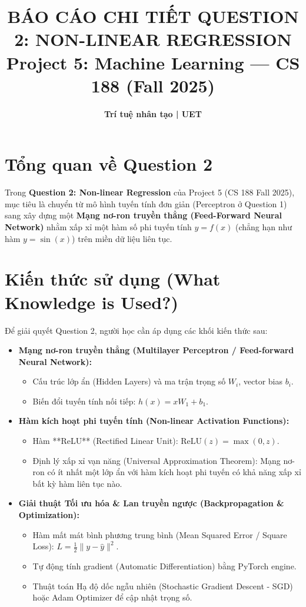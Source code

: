 \documentclass[11pt, a4paper]{article}
\title{\textbf{\Large BÁO CÁO CHI TIẾT QUESTION 2: NON-LINEAR REGRESSION}\\[0.3em]
\large Project 5: Machine Learning --- CS 188 (Fall 2025)}
\author{\textbf{Trí tuệ nhân tạo | UET}}
\begin{document}
\maketitle

\section{Tổng quan về Question 2}
Trong \textbf{Question 2: Non-linear Regression} của Project 5 (CS 188 Fall 2025), mục tiêu là chuyển từ mô hình tuyến tính đơn giản (Perceptron ở Question 1) sang xây dựng một \textbf{Mạng nơ-ron truyền thẳng (Feed-Forward Neural Network)} nhằm xấp xỉ một hàm số phi tuyến tính $y = f(x)$ (chẳng hạn như hàm $y = \sin(x)$) trên miền dữ liệu liên tục.

\section{Kiến thức sử dụng (What Knowledge is Used?)}
Để giải quyết Question 2, người học cần áp dụng các khối kiến thức sau:

\begin{itemize}[itemsep=4pt]
    \item \textbf{Mạng nơ-ron truyền thẳng (Multilayer Perceptron / Feed-forward Neural Network):}
    \begin{itemize}
        \item Cấu trúc lớp ẩn (Hidden Layers) và ma trận trọng số $W_i$, vector bias $b_i$.
        \item Biến đổi tuyến tính nối tiếp: $h(x) = x W_1 + b_1$.
    \end{itemize}
    \item \textbf{Hàm kích hoạt phi tuyến tính (Non-linear Activation Functions):}
    \begin{itemize}
        \item Hàm **ReLU** (Rectified Linear Unit): $\text{ReLU}(z) = \max(0, z)$.
        \item Định lý xấp xỉ vạn năng (Universal Approximation Theorem): Mạng nơ-ron có ít nhất một lớp ẩn với hàm kích hoạt phi tuyến có khả năng xấp xỉ bất kỳ hàm liên tục nào.
    \end{itemize}
    \item \textbf{Giải thuật Tối ưu hóa \& Lan truyền ngược (Backpropagation \& Optimization):}
    \begin{itemize}
        \item Hàm mất mát bình phương trung bình (Mean Squared Error / Square Loss): $L = \frac{1}{2} \| y - \hat{y} \|^2$.
        \item Tự động tính gradient (Automatic Differentiation) bằng PyTorch engine.
        \item Thuật toán Hạ độ dốc ngẫu nhiên (Stochastic Gradient Descent - SGD) hoặc Adam Optimizer để cập nhật trọng số.
    \end{itemize}
\end{itemize}
\end{document}
